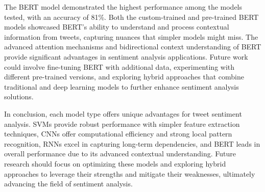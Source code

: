 \documentclass[12pt]{article}
\begin{document}
The BERT model demonstrated the highest performance among the models tested, with an accuracy of 81\%. Both the custom-trained and pre-trained BERT models showcased BERT's ability to understand and process contextual information from tweets, capturing nuances that simpler models might miss. The advanced attention mechanisms and bidirectional context understanding of BERT provide significant advantages in sentiment analysis applications. Future work could involve fine-tuning BERT with additional data, experimenting with different pre-trained versions, and exploring hybrid approaches that combine traditional and deep learning models to further enhance sentiment analysis solutions.

In conclusion, each model type offers unique advantages for tweet sentiment analysis. SVMs provide robust performance with simpler feature extraction techniques, CNNs offer computational efficiency and strong local pattern recognition, RNNs excel in capturing long-term dependencies, and BERT leads in overall performance due to its advanced contextual understanding. Future research should focus on optimizing these models and exploring hybrid approaches to leverage their strengths and mitigate their weaknesses, ultimately advancing the field of sentiment analysis.
\end{document}
